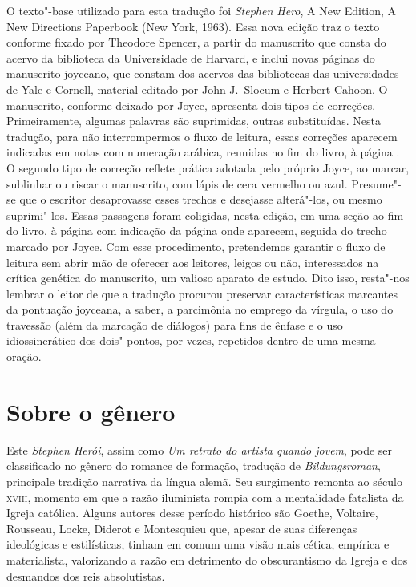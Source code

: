 O texto"-base utilizado para esta tradução foi \textit{Stephen Hero}, A New
Edition, A New Directions Paperbook (New York, 1963).  Essa nova edição traz o
texto conforme fixado por Theodore Spencer, a partir do manuscrito que consta
do acervo da biblioteca da Universidade de Harvard, e inclui novas páginas do
manuscrito joyceano, que constam dos acervos das bibliotecas das universidades
de Yale e Cornell, material editado por John J.~Slocum e Herbert Cahoon.  O
manuscrito, conforme deixado por Joyce, apresenta dois tipos de correções.
Primeiramente, algumas palavras são suprimidas, outras substituídas.  Nesta tradução, 
para não interrompermos o fluxo de leitura, essas correções aparecem indicadas em notas 
com numeração arábica, reunidas no fim do livro, à página \pageref{notas"-arabicas}.  
O segundo tipo de correção reflete prática adotada pelo próprio Joyce, ao marcar, sublinhar ou riscar o
manuscrito, com lápis de cera vermelho ou azul.  Presume"-se que o escritor
desaprovasse esses trechos e desejasse alterá"-los, ou mesmo suprimi"-los.
Essas passagens foram coligidas, nesta edição, em uma seção ao fim do livro, à página \pageref{passagens} 
com indicação da página onde aparecem, seguida do trecho marcado por Joyce. Com esse 
procedimento, pretendemos garantir o fluxo de leitura sem abrir mão de oferecer aos 
leitores, leigos ou não, interessados na crítica genética do manuscrito, um valioso 
aparato de estudo. Dito isso, resta"-nos lembrar o leitor de que a tradução procurou preservar
características marcantes da pontuação joyceana, a saber, a parcimônia no
emprego da vírgula, o uso do travessão (além da marcação de diálogos) para fins
de ênfase e o uso idiossincrático dos dois"-pontos, por vezes, repetidos dentro
de uma mesma oração.


\section{Sobre o gênero}

Este \textit{Stephen Herói}, assim como \textit{Um retrato do artista
quando jovem}, pode ser classificado no gênero do romance de formação, tradução
de \textit{Bildungsroman}, principale tradição narrativa da língua alemã.
Seu surgimento remonta ao século \textsc{xviii}, momento em que a razão iluminista
rompia com a mentalidade fatalista da Igreja católica.
Alguns autores desse período histórico são Goethe, Voltaire, Rousseau, Locke, Diderot e Montesquieu que, apesar de suas diferenças ideológicas e estilísticas, tinham em comum
uma visão mais cética, empírica e materialista, valorizando a razão em detrimento do obscurantismo da Igreja e dos desmandos dos reis absolutistas.

